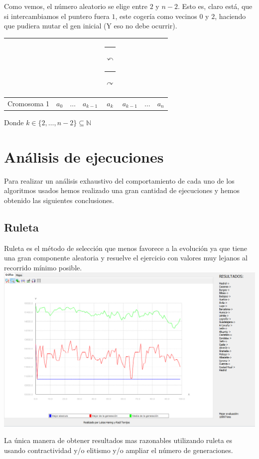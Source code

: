 \documentclass{article}
\def\MCr{
	\multicolumn{1}{c}{
		\rule{-5pt}{0ex}$\stackrel{}{\curvearrowleft}$
		\rule{+20pt}{0ex}$\stackrel{}{\curvearrowright}$
	}
}
\def\MCe{\multicolumn{1}{c}{}}
\begin{document}
Como vemos, el número aleatorio se elige entre $2$ y $n-2$. Esto es, claro está, que si intercambiamos el puntero fuera $1$, este cogería como vecinos $0$ y $2$, haciendo que pudiera mutar el gen inicial (Y eso no debe ocurrir).


\begin{tabular}{|l|*7{c|}}
	\MCe & \MCe & \MCe & \MCe & \MCr & \MCe & \MCe \\\hline
	Cromosoma 1 & $a_0$ & $\dots$ & $a_{k-1}$ & $a_{k}$ & $a_{k-1}$ & $\dots$ & $a_{n}$ \\\hline
\end{tabular}
\newline\newline
Donde $k\in \{2, \dots, n-2\}\subseteq\mathbb{N}$



\section{Análisis de ejecuciones}
Para realizar un análisis exhaustivo del comportamiento de cada uno de los algoritmos usados hemos realizado una gran cantidad de ejecuciones y hemos obtenido las siguientes conclusiones.
\subsection{Ruleta}

Ruleta es el método de selección que menos favorece a la evolución ya que tiene una gran componente aleatoria y resuelve el ejercicio con valores muy lejanos al recorrido mínimo posible.
\\

\includegraphics[scale=0.4]{./images/rule1.png}\par
\newpage
La única manera de obtener resultados mas razonables utilizando ruleta es usando contractividad y/o elitismo y/o ampliar el número de generaciones.
\\
\end{document}
